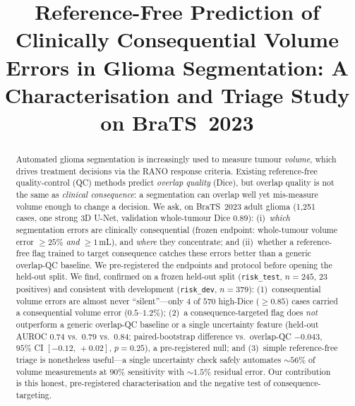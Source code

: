 \documentclass[conference]{IEEEtran}
\begin{document}
\title{Reference-Free Prediction of Clinically Consequential Volume Errors in
Glioma Segmentation: A Characterisation and Triage Study on BraTS~2023}

\author{%
%
}

\maketitle

\begin{abstract}
Automated glioma segmentation is increasingly used to measure tumour
\emph{volume}, which drives treatment decisions via the RANO response criteria.
Existing reference-free quality-control (QC) methods predict \emph{overlap
quality} (Dice), but overlap quality is not the same as \emph{clinical
consequence}: a segmentation can overlap well yet mis-measure volume enough to
change a decision. We ask, on BraTS~2023 adult glioma (1{,}251 cases, one strong
3D U-Net, validation whole-tumour Dice $0.89$): (i)~\emph{which} segmentation
errors are clinically consequential (frozen endpoint: whole-tumour volume error
$\geq 25\%$ \emph{and} $\geq 1$\,mL), and \emph{where} they concentrate; and
(ii)~whether a reference-free flag trained to target consequence catches these
errors better than a generic overlap-QC baseline. We pre-registered the
endpoints and protocol before opening the held-out split. We find, confirmed on
a frozen held-out split (\texttt{risk\_test}, $n{=}245$, $23$ positives) and
consistent with development (\texttt{risk\_dev}, $n{=}379$): (1)~consequential
volume errors are almost never ``silent''---only $4$ of $570$ high-Dice
($\geq 0.85$) cases carried a consequential volume error ($0.5$--$1.2\%$);
(2)~a consequence-targeted flag does \emph{not} outperform a generic overlap-QC
baseline or a single uncertainty feature (held-out AUROC $0.74$ vs.\ $0.79$ vs.\
$0.84$; paired-bootstrap difference vs.\ overlap-QC $-0.043$, $95\%$ CI
$[-0.12,\,+0.02]$, $p{=}0.25$), a pre-registered null; and (3)~simple
reference-free triage is nonetheless useful---a single uncertainty check safely
automates ${\sim}56\%$ of volume measurements at $90\%$ sensitivity with
${\sim}1.5\%$ residual error. Our contribution is this honest, pre-registered
characterisation and the negative test of consequence-targeting.
\end{abstract}
\end{document}
